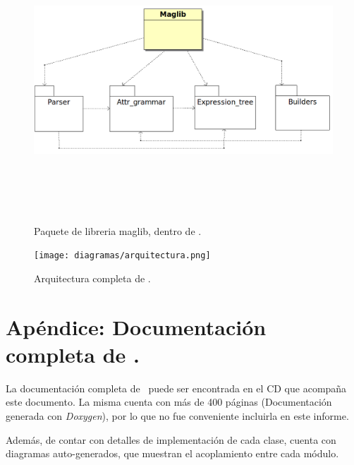 \begin{figure}[!ht]\centering
\includegraphics[width=635pt, height=300pt, angle=90]{diagramas/maggen.png}
\caption{\label{fig:dia-maglib}Paquete de libreria maglib, dentro de \maggen.}
\end{figure}

\begin{figure}[!ht]\centering
\texttt{[image: diagramas/arquitectura.png]}
\caption{\label{fig:arquitec-full}Arquitectura completa de \maggen.}
\end{figure}



\chapter{Apéndice: Documentación completa de \maggen.}
\label{chap:appendix-b}
La documentación completa de \maggen\ puede ser encontrada en el CD que acompaña este documento. La misma cuenta con más de 400 páginas (Documentación generada con \textit{Doxygen}), por lo que no fue conveniente incluirla en este informe. 

Además, de contar con detalles de implementación de cada clase, cuenta con diagramas auto-generados, que muestran el acoplamiento entre cada módulo.

